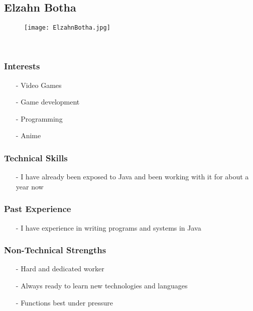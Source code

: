 
\subsection{Elzahn Botha}
\begin{wrapfigure}[6]{l}{0.25\textwidth}
\vspace{10pt}
\texttt{[image: ElzahnBotha.jpg]}
\end{wrapfigure}

\textcolor{white}{.}
\subsubsection{Interests}
\begin{itemize}
	\item[-]{Video Games}
	\item[-]{Game development}
	\item[-]{Programming}
	\item[-]{Anime}
\end{itemize}
\subsubsection{Technical Skills} 
\begin{itemize}
	\item[-]{I have already been exposed to Java and been working with it for about a year now}
\end{itemize}
\subsubsection{Past Experience}
\begin{itemize}
	\item[-]{I have experience in writing programs and systems in Java}
\end{itemize}
\subsubsection{Non-Technical Strengths} 
\begin{itemize}
	\item[-]{Hard and dedicated worker}
	\item[-]{Always ready to learn new technologies and languages}
	\item[-]{Functions best under pressure}
\end{itemize}
